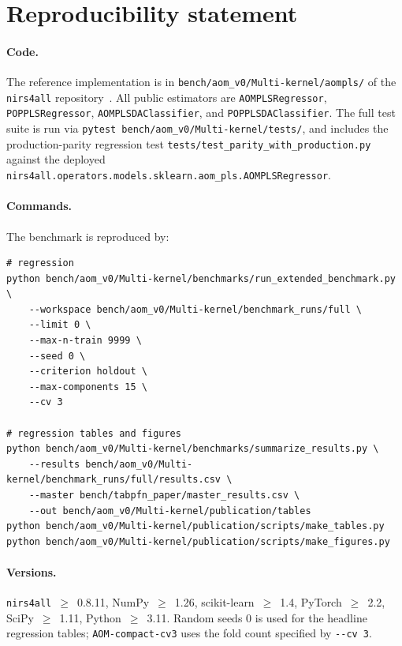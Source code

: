 \documentclass[review,a4paper]{elsarticle}
\newcommand{\nirsfourall}{\texttt{nirs4all}\xspace}
\begin{document}
\section{Reproducibility statement}\label{sec:reproducibility}

\paragraph{Code.}
The reference implementation is in
\verb|bench/aom_v0/Multi-kernel/aompls/| of the
\nirsfourall repository~\cite{nirs4all2025}. All public estimators are
\verb|AOMPLSRegressor|, \verb|POPPLSRegressor|, \verb|AOMPLSDAClassifier|,
and \verb|POPPLSDAClassifier|. The full test suite is run via
\verb|pytest bench/aom_v0/Multi-kernel/tests/|, and includes the production-parity
regression test
\verb|tests/test_parity_with_production.py| against the deployed
\verb|nirs4all.operators.models.sklearn.aom_pls.AOMPLSRegressor|.

\paragraph{Commands.}
The benchmark is reproduced by:
\begin{verbatim}
# regression
python bench/aom_v0/Multi-kernel/benchmarks/run_extended_benchmark.py \
    --workspace bench/aom_v0/Multi-kernel/benchmark_runs/full \
    --limit 0 \
    --max-n-train 9999 \
    --seed 0 \
    --criterion holdout \
    --max-components 15 \
    --cv 3

# regression tables and figures
python bench/aom_v0/Multi-kernel/benchmarks/summarize_results.py \
    --results bench/aom_v0/Multi-kernel/benchmark_runs/full/results.csv \
    --master bench/tabpfn_paper/master_results.csv \
    --out bench/aom_v0/Multi-kernel/publication/tables
python bench/aom_v0/Multi-kernel/publication/scripts/make_tables.py
python bench/aom_v0/Multi-kernel/publication/scripts/make_figures.py
\end{verbatim}

\paragraph{Versions.}
\nirsfourall~$\geq$~0.8.11, NumPy~$\geq$~1.26, scikit-learn~$\geq$~1.4,
PyTorch~$\geq$~2.2, SciPy~$\geq$~1.11, Python~$\geq$~3.11. Random seeds
$0$ is used for the headline regression tables; \texttt{AOM-compact-cv3}
uses the fold count specified by \verb|--cv 3|.
\end{document}
